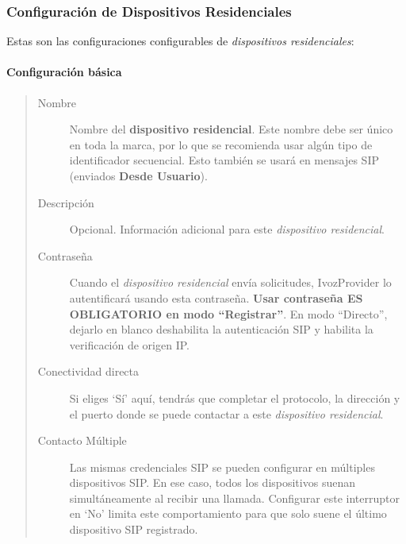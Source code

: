 \documentclass[letterpaper,10pt,spanish]{sphinxmanual}
\begin{document}
\subsubsection{Configuración de Dispositivos Residenciales}
\label{administration_portal/client/residential/residential_devices:residential-devices-configuration}
Estas son las configuraciones configurables de \emph{dispositivos residenciales}:


\paragraph{Configuración básica}
\label{administration_portal/client/residential/residential_devices:basic-configuration}\begin{quote}
\begin{description}
\item[{Nombre}] \leavevmode
Nombre del \textbf{dispositivo residencial}. Este nombre debe ser único en toda la marca, por lo que se recomienda usar algún tipo de identificador secuencial. Esto también se usará en mensajes SIP (enviados \textbf{Desde Usuario}).

\item[{Descripción}] \leavevmode
Opcional. Información adicional para este \emph{dispositivo residencial}.

\item[{Contraseña}] \leavevmode
Cuando el \emph{dispositivo residencial} envía solicitudes, IvozProvider lo autentificará usando esta contraseña. \textbf{Usar contraseña ES OBLIGATORIO en modo ``Registrar''}. En modo ``Directo'', dejarlo en blanco deshabilita la autenticación SIP y habilita la verificación de origen IP.

\item[{Conectividad directa}] \leavevmode
Si eliges `Sí' aquí, tendrás que completar el protocolo, la dirección y el puerto donde se puede contactar a este \emph{dispositivo residencial}.

\item[{Contacto Múltiple}] \leavevmode
Las mismas credenciales SIP se pueden configurar en múltiples dispositivos SIP. En ese caso, todos los dispositivos suenan simultáneamente al recibir una llamada. Configurar este interruptor en `No' limita este comportamiento para que solo suene el último dispositivo SIP registrado.

\end{description}
\end{quote}
\end{document}
